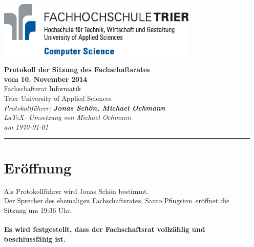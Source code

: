 \documentclass[a4paper, 11pt]{article} %
\newcommand{\protokoller}{Jonas Schön, Michael Ochmann}
\newcommand{\dateOfMeeting}{10. November 2014}
\newcommand{\TeXer}{Michael Ochmann}
\newcommand{\fsiPresident}{Santo Pfingsten}
\begin{document}

\doublespacing
\thispagestyle{empty}

\begin{center}
\includegraphics[width=10.0cm]{../logo_faculty_computer_science.eps}

\vspace*{\fill}
{\LARGE \textbf{Protokoll der Sitzung des Fachschaftsrates \\vom \dateOfMeeting}}\\
Fachschaftsrat Informatik\\
Trier University of Applied Sciences\\
\vspace{2.5cm}
\textit{
	Protokollführer: \textbf{\protokoller} \\
	\LaTeX - Umsetzung von \TeXer\\
	am \today
}
\vfill
\end{center}

\hspace*{-35cm}
\textcolor{fsi}{\rule{64.9cm}{15pt}}
\pagebreak
 
\setcounter{tocdepth}{2}
\tableofcontents 
\pagebreak

\section{Eröffnung}
Als Protokollführer wird Jonas Schön bestimmt.\\
Der Sprecher des ehemaligen Fachschaftsrates, \fsiPresident~eröffnet die Sitzung um 19:36 Uhr.
\\\\
\textbf{Es wird festgestellt, dass der Fachschaftsrat vollzählig und beschlussfähig ist.}
\end{document}
